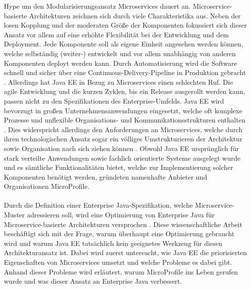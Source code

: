 Hype um den Modularisierungsansatz Microservices dauert an. Microservice-basierte Architekturen zeichnen sich durch viele Charakteristika aus. Neben der losen Kopplung und der moderaten Größe der Komponenten fokussiert sich dieser Ansatz vor allem auf eine erhöhte Flexibilität bei der Entwicklung und dem Deployment. Jede Komponente soll als eigene Einheit angesehen werden können, welche selbständig (weiter-) entwickelt und vor allem unabhängig von anderen Komponenten deployt werden kann. Durch Automatisierung wird die Software schnell und sicher über eine Continuous-Delivery-Pipeline in Produktion gebracht \cite{EberhardWolff.2015}. Allerdings hat Java EE in Bezug zu Microservices einen schlechten Ruf. Die agile Entwicklung und die kurzen Zyklen, bis ein Release ausgerollt werden kann, passen nicht zu den Spezifikationen des Enterprise-Umfelds. Java EE wird bevorzugt in großen Unternehmensanwendungen eingesetzt, welche oft komplexe Prozesse und unflexible Organisations- und Kommunikationsstrukturen enthalten \cite{jaxcenter.2016}. Dies widerspricht allerdings den Anforderungen an Microservices, welche durch ihren technologischen Ansatz sogar ein völliges Umstrukturieren der Architektur sowie Organisation nach sich ziehen können \cite{EberhardWolff.2015}. Obwohl Java EE ursprünglich für stark verteilte Anwendungen sowie fachlich orientierte Systeme ausgelegt wurde und es sämtliche Funktionalitäten bietet, welche zur Implementierung solcher Komponenten benötigt werden, gründeten namenhafte Anbieter und Organisationen MicroProfile.\\ \\
Durch die Definition einer Enterprise Java-Spezifikation, welche Microservice-Muster adressieren soll, wird eine Optimierung von Enterprise Java für Microservice-basierte Architekturen versprochen \cite{Microprofile.2017}. Diese wissenschaftliche Arbeit beschäftigt sich mit der Frage, warum überhaupt eine Optimierung gebraucht wird und warum Java EE tatsächlich kein geeignetes Werkzeug für diesen Architekturansatz ist. Dabei wird zuerst untersucht, wie Java EE die priorisierten Eigenschaften von Microservices umsetzt und welche Probleme es dabei gibt. Anhand dieser Probleme wird erläutert, warum MicroProfile ins Leben gerufen wurde und was dieser Ansatz an Enterprise Java verbessert. \\ \\
